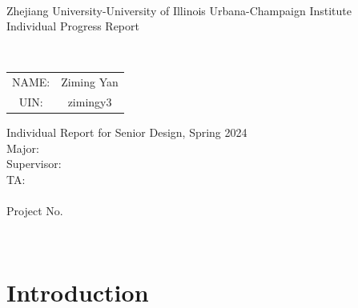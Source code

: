 \documentclass{senior-design-individual}
\begin{document}
\begin{titlepage}
    \begin{center}
        ~~\\ %
        \vspace{1.5cm}
        {\fontsize{16}{24}\selectfont Zhejiang University-University of Illinois Urbana-Champaign Institute}\\
        \vspace{1.88cm}
        {\fontsize{28}{42}\selectfont Individual Progress Report}\\
        \vspace{1.6cm}
        \begin{minipage}{15.92cm}
            \centering
            \fontsize{26}{26}\selectfont
            \MakeUppercase{\bf \RPTTITLE}
        \end{minipage}\\[2cm]
        \begin{table}[h]
            \centering
            \fontsize{14}{12}\selectfont
            \renewcommand{\arraystretch}{1.5}
            \begin{tabular}{cc}
                NAME:&Ziming Yan\\
                UIN:&zimingy3\\
            \end{tabular}
        \end{table}
        \vfill
        {\fontsize{12}{\baselineskip}\selectfont Individual Report for Senior Design, Spring 2024\\
            Major: \MAJOR \\
            Supervisor: \FACULTYNAME \\
            TA:~ \TANAME\\
            \vfill}
        {\fontsize{12}{18}\selectfont\RPTDATE\\
            Project No. \PROJNBR}
    \end{center}
    \vspace{2cm}
    ~
    \restoregeometry
\end{titlepage}
\tableofcontents
\mainmatter
\chapter{Introduction}
\end{document}
